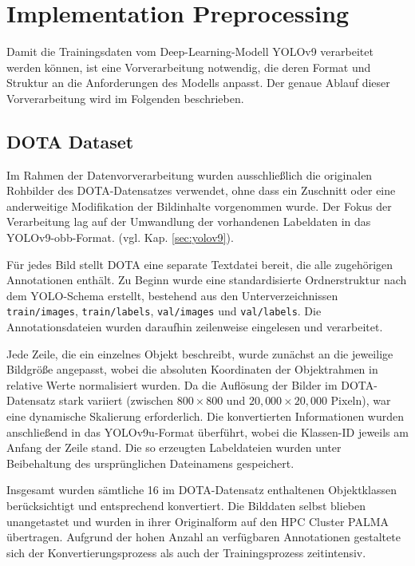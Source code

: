 

\section{Implementation Preprocessing}

Damit die Trainingsdaten vom Deep-Learning-Modell YOLOv9 verarbeitet werden können, ist eine Vorverarbeitung notwendig, die deren Format und Struktur an die Anforderungen des Modells anpasst. Der genaue Ablauf dieser Vorverarbeitung wird im Folgenden beschrieben.
\subsection{DOTA Dataset}
Im Rahmen der Datenvorverarbeitung wurden ausschließlich die originalen Rohbilder des \acrshort{DOTA}-Datensatzes verwendet, ohne dass ein Zuschnitt oder eine anderweitige Modifikation der Bildinhalte vorgenommen wurde. Der Fokus der Verarbeitung lag auf der Umwandlung der vorhandenen Labeldaten in das \acrshort{YOLO}v9-\acrshort{obb}-Format. (vgl. Kap. \ref{sec:yolov9}).

Für jedes Bild stellt \acrshort{DOTA} eine separate Textdatei bereit, die alle zugehörigen Annotationen enthält. Zu Beginn wurde eine standardisierte Ordnerstruktur nach dem \acrshort{YOLO}-Schema erstellt, bestehend aus den Unterverzeichnissen \texttt{train/images}, \texttt{train/labels}, \texttt{val/images} und \texttt{val/labels}. Die Annotationsdateien wurden daraufhin zeilenweise eingelesen und verarbeitet.

Jede Zeile, die ein einzelnes Objekt beschreibt, wurde zunächst an die jeweilige Bildgröße angepasst, wobei die absoluten Koordinaten der Objektrahmen in relative Werte normalisiert wurden. Da die Auflösung der Bilder im \acrshort{DOTA}-Datensatz stark variiert (zwischen \(800 \times 800\) und \(20{,}000 \times 20{,}000\) Pixeln), war eine dynamische Skalierung erforderlich. Die konvertierten Informationen wurden anschließend in das  \acrshort{YOLO}v9u-Format überführt, wobei die Klassen-ID jeweils am Anfang der Zeile stand. Die so erzeugten Labeldateien wurden unter Beibehaltung des ursprünglichen Dateinamens gespeichert.

Insgesamt wurden sämtliche 16 im \acrshort{DOTA}-Datensatz enthaltenen Objektklassen berücksichtigt und entsprechend konvertiert. Die Bilddaten selbst blieben unangetastet und wurden in ihrer Originalform auf den HPC Cluster \acrshort{PALMA} übertragen. Aufgrund der hohen Anzahl an verfügbaren Annotationen gestaltete sich der Konvertierungsprozess als auch der Trainingsprozess zeitintensiv.

